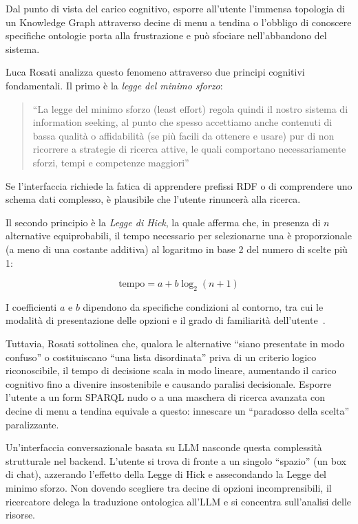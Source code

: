     Dal punto di vista del carico cognitivo, esporre all'utente l'immensa topologia di un Knowledge Graph attraverso decine di menu a tendina o l'obbligo di conoscere specifiche ontologie porta alla frustrazione e può sfociare nell'abbandono del sistema.

    Luca Rosati analizza questo fenomeno attraverso due principi cognitivi fondamentali. Il primo è la \textit{legge del minimo sforzo}:

    \begin{quotation}
    ``La legge del minimo sforzo (least effort) regola quindi il nostro sistema di information seeking, al punto che spesso accettiamo anche contenuti di bassa qualità o affidabilità (se più facili da ottenere e usare) pur di non ricorrere a strategie di ricerca attive, le quali comportano necessariamente sforzi, tempi e competenze maggiori''\hfill\cite{Ros07}
    \end{quotation}

    Se l'interfaccia richiede la fatica di apprendere prefissi RDF o di comprendere uno schema dati complesso, è plausibile che l'utente rinuncerà alla ricerca.

    Il secondo principio è la \textit{Legge di Hick}, la quale afferma che, in presenza di $n$ alternative equiprobabili, il tempo necessario per selezionarne una è proporzionale (a meno di una costante additiva) al logaritmo in base 2 del numero di scelte più 1:

    \[ \text{tempo} = a + b \log_2(n+1) \]

    I coefficienti $a$ e $b$ dipendono da specifiche condizioni al contorno, tra cui le modalità di presentazione delle opzioni e il grado di familiarità dell'utente~\cite{Ros07}.

    Tuttavia, Rosati sottolinea che, qualora le alternative ``siano presentate in modo confuso'' o costituiscano ``una lista disordinata'' priva di un criterio logico riconoscibile, il tempo di decisione scala in modo lineare, aumentando il carico cognitivo fino a divenire insostenibile e causando paralisi decisionale. Esporre l'utente a un form SPARQL nudo o a una maschera di ricerca avanzata con decine di menu a tendina equivale a questo: innescare un ``paradosso della scelta'' paralizzante.

    Un'interfaccia conversazionale basata su LLM nasconde questa complessità strutturale nel backend. L'utente si trova di fronte a un singolo ``spazio'' (un box di chat), azzerando l'effetto della Legge di Hick e assecondando la Legge del minimo sforzo. Non dovendo scegliere tra decine di opzioni incomprensibili, il ricercatore delega la traduzione ontologica all'LLM e si concentra sull'analisi delle risorse.

